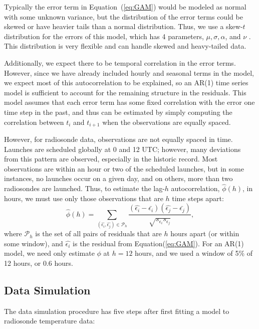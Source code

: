 \documentclass[12pt]{article}
\def\ni{\noindent}
\begin{document}
\begin{doublespacing}
Typically the error term in Equation~(\ref{eq:GAM}) would be modeled as normal with some unknown variance, but the distribution of the error terms could be skewed or have heavier tails than a normal distribution.  Thus, we use a skew-$t$ distribution for the errors of this model, which has 4 parameters, $\mu, \sigma, \alpha$, and $\nu$ \cite{azzalini03}.  This distribution is very flexible and can handle skewed and heavy-tailed data.

Additionally, we expect there to be temporal correlation in the error terms.  However, since we have already included hourly and seasonal terms in the model, we expect most of this autocorrelation to be explained, so an AR(1) time series model is sufficient to account for the remaining structure in the residuals.  This model assumes that each error term has some fixed correlation with the error one time step in the past, and thus can be estimated by simply computing the correlation between $t_i$ and $t_{i+1}$ when the observations are equally spaced.

However, for radiosonde data, observations are not equally spaced in time.  Launches are scheduled globally at 0 and 12 UTC; however, many deviations from this pattern are observed, especially in the historic record.  Most observations are within an hour or two of the scheduled launches, but in some instances, no launches occur on a given day, and on others, more than two radiosondes are launched.   Thus, to estimate the lag-$h$  autocorrelation, $\widehat{\phi}(h)$, in hours, we must use only those observations that are $h$ time steps apart:
\begin{equation} \label{eq:ACF}
	\widehat{\phi}(h)=\sum_{(\widehat{\epsilon_i},\widehat{\epsilon_j}) \in \mathcal{P}_h} \frac{(\widehat{\epsilon_i}-\bar{\epsilon_i})(\widehat{\epsilon_j}-\bar{\epsilon_j})}{\sqrt{s_{\epsilon_i} s_{\epsilon_j}}},
\end{equation}
\ni where $\mathcal{P}_h$ is the set of all pairs of residuals that are $h$ hours apart (or within some window), and $\widehat{\epsilon_i}$ is the residual from Equation(\ref{eq:GAM}).  For an AR(1) model, we need only estimate $\phi$ at $h=12$ hours, and we used a window of 5\% of 12 hours, or 0.6 hours.

\subsection{Data Simulation}
\label{ssec:sim}

The data simulation procedure has five steps after first fitting a model to radiosonde temperature data:


\end{doublespacing}
\end{document}
